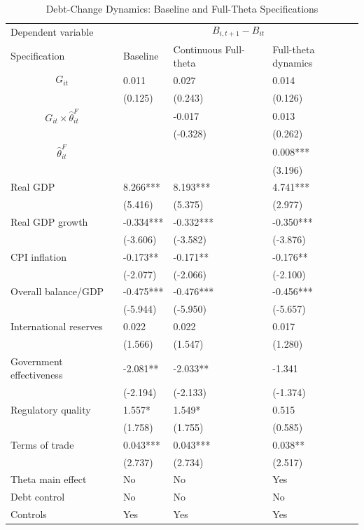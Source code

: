 \begin{table}[H]\centering
\begin{threeparttable}
\caption{Debt-Change Dynamics: Baseline and Full-Theta Specifications}
\label{tab:debt_change_combined_fulltheta}
\scriptsize
\begin{tabularx}{\textwidth}{lYYY}
\toprule
Dependent variable &  \\
\cmidrule(lr){2-4}
Specification & Baseline & Continuous Full-theta & Full-theta dynamics \\
\midrule
$$G_{it}$$ & 0.011 & 0.027 & 0.014 \\
 & (0.125) & (0.243) & (0.126) \\
$$G_{it}\times\widehat{\theta}^{F}_{it}$$ &  & -0.017 & 0.013 \\
 &  & (-0.328) & (0.262) \\
$$\widehat{\theta}^{F}_{it}$$ &  &  & 0.008*** \\
 &  &  & (3.196) \\
Real GDP & 8.266*** & 8.193*** & 4.741*** \\
 & (5.416) & (5.375) & (2.977) \\
Real GDP growth & -0.334*** & -0.332*** & -0.350*** \\
 & (-3.606) & (-3.582) & (-3.876) \\
CPI inflation & -0.173** & -0.171** & -0.176** \\
 & (-2.077) & (-2.066) & (-2.100) \\
Overall balance/GDP & -0.475*** & -0.476*** & -0.456*** \\
 & (-5.944) & (-5.950) & (-5.657) \\
International reserves & 0.022 & 0.022 & 0.017 \\
 & (1.566) & (1.547) & (1.280) \\
Government effectiveness & -2.081** & -2.033** & -1.341 \\
 & (-2.194) & (-2.133) & (-1.374) \\
Regulatory quality & 1.557* & 1.549* & 0.515 \\
 & (1.758) & (1.755) & (0.585) \\
Terms of trade & 0.043*** & 0.043*** & 0.038** \\
 & (2.737) & (2.734) & (2.517) \\
\midrule
Theta main effect & No & No & Yes \\
Debt control & No & No & No \\
Controls & Yes & Yes & Yes \\

\end{tabularx}
\end{threeparttable}
\end{table}
